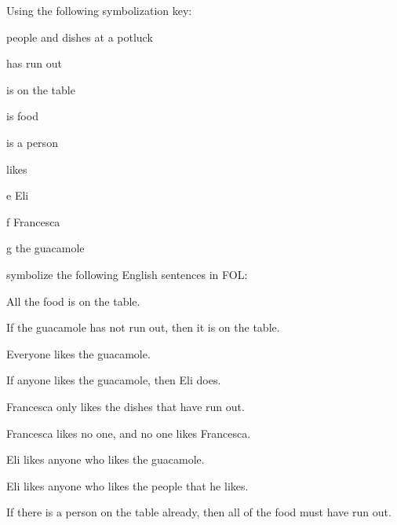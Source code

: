 \problempart
Using the following symbolization key:
\begin{ekey}
\item[\text{domain}] people and dishes at a potluck
\item[\atom{R}{x}]  has run out
\item[\atom{T}{x}]  is on the table
\item[\atom{F}{x}]  is food
\item[\atom{P}{x}]  is a person
\item[\atom{L}{x,y}]  likes 
\item[e] Eli
\item[f] Francesca
\item[g] the guacamole
\end{ekey}
symbolize the following English sentences in FOL:
\begin{compactlist}
\item All the food is on the table.
\item If the guacamole has not run out, then it is on the table.
\item Everyone likes the guacamole.
\item If anyone likes the guacamole, then Eli does.
\item Francesca only likes the dishes that have run out.
\item Francesca likes no one, and no one likes Francesca.
\item Eli likes anyone who likes the guacamole.
\item Eli likes anyone who likes the people that he likes.
\item If there is a person on the table already, then all of the food must have run out.
\end{compactlist}


